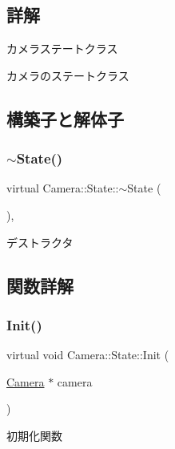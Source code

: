 \subsection{詳解}
カメラステートクラス 

カメラのステートクラス 

\subsection{構築子と解体子}
\mbox{\label{class_camera_1_1_state_a61b74bb711d49e26c0f07af65fb74eb9}} 
\subsubsection{\texorpdfstring{$\sim$\+State()}{~State()}}
{\footnotesize\ttfamily virtual Camera\+::\+State\+::$\sim$\+State (\begin{DoxyParamCaption}{ }\end{DoxyParamCaption})\hspace{0.3cm}{\ttfamily [inline]}, {\ttfamily [virtual]}}



デストラクタ 



\subsection{関数詳解}
\mbox{\label{class_camera_1_1_state_aa1b81471ab15e64b3117ffe7de9560ff}} 
\subsubsection{\texorpdfstring{Init()}{Init()}}
{\footnotesize\ttfamily virtual void Camera\+::\+State\+::\+Init (\begin{DoxyParamCaption}\item[{\mbox{\hyperlink{class_camera}{Camera}} $\ast$}]{camera }\end{DoxyParamCaption})\hspace{0.3cm}{\ttfamily [pure virtual]}}



初期化関数 


